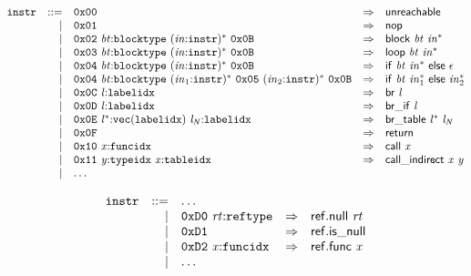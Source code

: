 \vspace{1ex}

$$
\begin{array}{@{}l@{}rrlll@{}l@{}}
& {\mathtt{instr}} &::=& \mathtt{0x00} &\Rightarrow& \mathsf{unreachable} \\ &&|&
\mathtt{0x01} &\Rightarrow& \mathsf{nop} \\ &&|&
\mathtt{0x02}~{\mathit{bt}}{:}{\mathtt{blocktype}}~{({\mathit{in}}{:}{\mathtt{instr}})^\ast}~\mathtt{0x0B} &\Rightarrow& \mathsf{block}~{\mathit{bt}}~{{\mathit{in}}^\ast} \\ &&|&
\mathtt{0x03}~{\mathit{bt}}{:}{\mathtt{blocktype}}~{({\mathit{in}}{:}{\mathtt{instr}})^\ast}~\mathtt{0x0B} &\Rightarrow& \mathsf{loop}~{\mathit{bt}}~{{\mathit{in}}^\ast} \\ &&|&
\mathtt{0x04}~{\mathit{bt}}{:}{\mathtt{blocktype}}~{({\mathit{in}}{:}{\mathtt{instr}})^\ast}~\mathtt{0x0B} &\Rightarrow& \mathsf{if}~{\mathit{bt}}~{{\mathit{in}}^\ast}~\mathsf{else}~\epsilon \\ &&|&
\mathtt{0x04}~{\mathit{bt}}{:}{\mathtt{blocktype}}~{({\mathit{in}}_{{1}}{:}{\mathtt{instr}})^\ast}~\mathtt{0x05}~{({\mathit{in}}_{{2}}{:}{\mathtt{instr}})^\ast}~\mathtt{0x0B} &\Rightarrow& \mathsf{if}~{\mathit{bt}}~{{\mathit{in}}_{{1}}^\ast}~\mathsf{else}~{{\mathit{in}}_{{2}}^\ast} \\ &&|&
\mathtt{0x0C}~{\mathit{l}}{:}{\mathtt{labelidx}} &\Rightarrow& \mathsf{br}~{\mathit{l}} \\ &&|&
\mathtt{0x0D}~{\mathit{l}}{:}{\mathtt{labelidx}} &\Rightarrow& \mathsf{br\_if}~{\mathit{l}} \\ &&|&
\mathtt{0x0E}~{{\mathit{l}}^\ast}{:}{\mathtt{vec}}({\mathtt{labelidx}})~{\mathit{l}}_{{\mathit{N}}}{:}{\mathtt{labelidx}} &\Rightarrow& \mathsf{br\_table}~{{\mathit{l}}^\ast}~{\mathit{l}}_{{\mathit{N}}} \\ &&|&
\mathtt{0x0F} &\Rightarrow& \mathsf{return} \\ &&|&
\mathtt{0x10}~{\mathit{x}}{:}{\mathtt{funcidx}} &\Rightarrow& \mathsf{call}~{\mathit{x}} \\ &&|&
\mathtt{0x11}~{\mathit{y}}{:}{\mathtt{typeidx}}~{\mathit{x}}{:}{\mathtt{tableidx}} &\Rightarrow& \mathsf{call\_indirect}~{\mathit{x}}~{\mathit{y}} \\ &&|&
\dots \\
\end{array}
$$

\vspace{1ex}

$$
\begin{array}{@{}l@{}rrlll@{}l@{}}
& {\mathtt{instr}} &::=& \dots \\ &&|&
\mathtt{0xD0}~{\mathit{rt}}{:}{\mathtt{reftype}} &\Rightarrow& \mathsf{ref.null}~{\mathit{rt}} \\ &&|&
\mathtt{0xD1} &\Rightarrow& \mathsf{ref.is\_null} \\ &&|&
\mathtt{0xD2}~{\mathit{x}}{:}{\mathtt{funcidx}} &\Rightarrow& \mathsf{ref.func}~{\mathit{x}} \\ &&|&
\dots \\
\end{array}
$$

